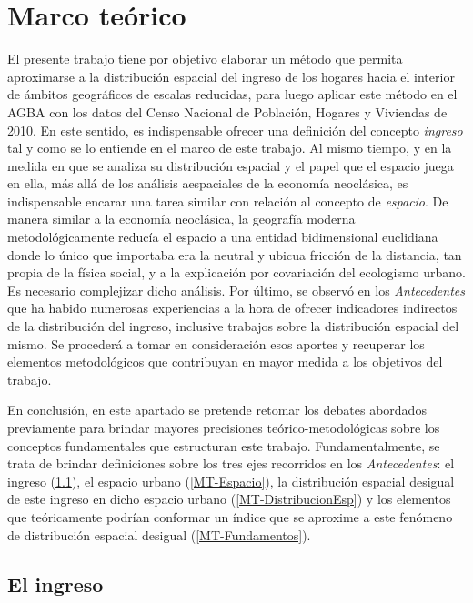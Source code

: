 	\section{Marco teórico}
	
	El presente trabajo tiene por objetivo elaborar un método que permita aproximarse a la distribución espacial del ingreso de los hogares hacia el interior de ámbitos geográficos de escalas reducidas, para luego aplicar este método en el AGBA con los datos del Censo Nacional de Población, Hogares y Viviendas de 2010. En este sentido, es indispensable ofrecer una definición del concepto \textit{ingreso } tal y como se lo entiende en el marco de este trabajo. Al mismo tiempo, y en la medida en que se analiza su distribución espacial y el papel que el espacio juega en ella, más allá de los análisis aespaciales de la economía neoclásica, es indispensable encarar una tarea similar con relación al concepto de \textit{espacio}. De manera similar a la economía neoclásica, la geografía moderna metodológicamente reducía el espacio a una entidad bidimensional euclidiana donde lo único que importaba era la neutral y ubicua fricción de la distancia, tan propia de la física social, y a la explicación por covariación del ecologismo urbano. Es necesario complejizar dicho análisis. Por último, se observó en los \textit{Antecedentes} que ha habido numerosas experiencias a la hora de ofrecer indicadores indirectos de la distribución del ingreso, inclusive trabajos sobre la distribución espacial del mismo. Se procederá a tomar en consideración esos aportes y recuperar los elementos metodológicos que contribuyan en mayor medida a los objetivos del trabajo.
	
	En conclusión, en este apartado se pretende retomar los debates abordados previamente para brindar mayores precisiones teórico-metodológicas sobre los conceptos fundamentales que estructuran este trabajo. Fundamentalmente, se trata de brindar definiciones sobre los tres ejes recorridos en los \textit{Antecedentes}: el ingreso (\ref{MT-Ingreso}), el espacio urbano (\ref{MT-Espacio}), la distribución espacial desigual de este ingreso en dicho espacio urbano (\ref{MT-DistribucionEsp}) y los elementos que teóricamente podrían conformar un índice que se aproxime a este fenómeno de distribución espacial desigual (\ref{MT-Fundamentos}).
	
	\subsection{El ingreso}\label{MT-Ingreso}
	
